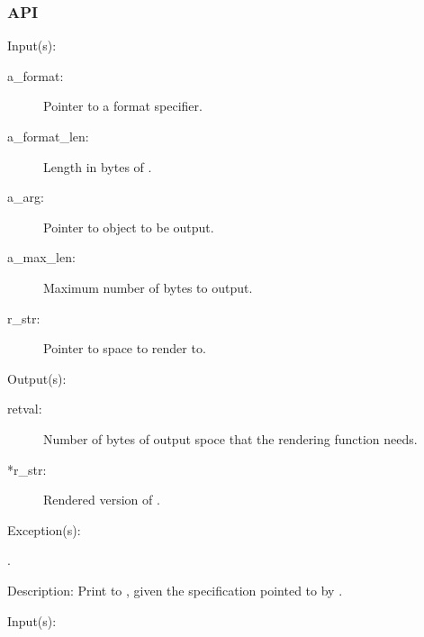\subsubsection{API}
\begin{capi}
\label{cw_out_render_t}
	\begin{capilist}
	\item[Input(s): ]
		\begin{description}\item[]
		\item[a\_format: ]
			Pointer to a format specifier.
		\item[a\_format\_len: ]
			Length in bytes of .
		\item[a\_arg: ]
			Pointer to object to be output.
		\item[a\_max\_len: ]
			Maximum number of bytes to output.
		\item[r\_str: ]
			Pointer to space to render to.
		\end{description}
	\item[Output(s): ]
		\begin{description}\item[]
		\item[retval: ]
			Number of bytes of output spoce that the rendering
			function needs.
		\item[*r\_str: ]
			Rendered version of .
		\end{description}
	\item[Exception(s): ]
		\begin{description}\item[]
		\item[.]
		\end{description}
	\item[Description: ]
		Print  to , given the specification
		pointed to by .
	\end{capilist}
\label{out_new}
	\begin{capilist}
	\item[Input(s): ]
		\begin{description}\item[]

\end{description}
\end{capilist}
\end{capi}
